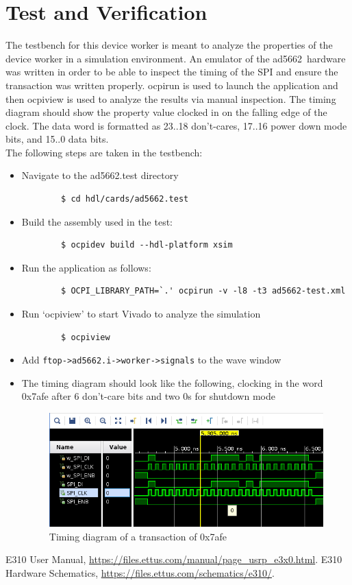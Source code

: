 \documentclass{article}
\def\comp{ad5662}
\begin{document}
\section*{Test and Verification}
The testbench for this device worker is meant to analyze the properties of the device worker in a simulation environment. An emulator of the \comp\ hardware was written in order to be able to inspect the timing of the SPI and ensure the transaction was written properly. ocpirun is used to launch the application and then ocpiview is used to analyze the results via manual inspection. The timing diagram should show the property value clocked in on the falling edge of the clock. The data word is formatted as 23..18 don't-cares, 17..16 power down mode bits, and 15..0 data bits.
\\\medskip
The following steps are taken in the testbench:
	\begin{itemize}
		\item[1.] Navigate to the \comp.test directory
		\begin{verbatim}		
		$ cd hdl/cards/ad5662.test
		\end{verbatim}
		\item[2.] Build the assembly used in the test:
		\begin{verbatim}		
		$ ocpidev build --hdl-platform xsim		
		\end{verbatim}
		\item[2.] Run the application as follows:
		\begin{verbatim}		
		$ OCPI_LIBRARY_PATH=`.' ocpirun -v -l8 -t3 ad5662-test.xml
		\end{verbatim}
		\item[3.] Run `ocpiview' to start Vivado to analyze the simulation
		\begin{verbatim}		
		$ ocpiview	
		\end{verbatim}
		\item[4.] Add \verb!ftop->ad5662.i->worker->signals! to the wave window
		\item[5.] The timing diagram should look like the following, clocking in the word 0x7afe after 6 don't-care bits and two 0s for shutdown mode
		\begin{figure}[ht]
	\centerline{\includegraphics[scale=0.75]{timing}}
	\caption{Timing diagram of a transaction of 0x7afe}
	\label{fig:tb}
\end{figure}
	\end{itemize}

\begin{thebibliography}{2}
  E310 User Manual,
  \url{https://files.ettus.com/manual/page\_usrp\_e3x0.html}.
  E310 Hardware Schematics,
  \url{https://files.ettus.com/schematics/e310/}.
\end{thebibliography}
\end{document}
